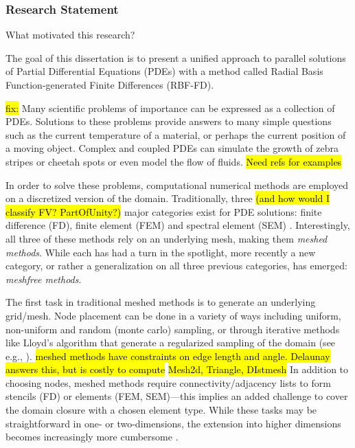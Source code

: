 \subsubsection{Research Statement} 
What motivated this research?
\label{sec:intro}

The goal of this dissertation is to present a unified approach
to parallel solutions of Partial Differential Equations (PDEs)
with a method called Radial Basis Function-generated Finite
Differences (RBF-FD).

\hl{fix:}
Many scientific problems of importance can be expressed as a
collection of PDEs. Solutions to these problems provide answers to many simple
questions such as the current temperature of a material, or perhaps the
current position of a moving object. Complex and coupled PDEs can simulate the growth of zebra stripes or cheetah spots \cite{FuselierWright2012} or even model the flow of fluids. \hl{Need refs for examples}


In order to solve these problems, computational numerical
methods are employed on a discretized version of the domain.
Traditionally, three \hl{(and how would I classify FV? PartOfUnity?)} major categories exist for PDE solutions:
finite difference (FD), finite element (FEM) and spectral
element (SEM) \cite{Fasshauer2007}. Interestingly, all three of
these methods rely on an underlying mesh, making them
\emph{meshed methods}. While each has had a turn in the
spotlight, more recently a new category, or rather a
generalization on all three previous categories, has emerged:
\emph{meshfree methods}.

The first task in traditional meshed methods is to generate an
underlying grid/mesh. Node placement can be done in a variety of
ways including uniform, non-uniform and random (monte carlo)
sampling, or through iterative methods like Lloyd's algorithm
that generate a regularized sampling of the domain (see e.g.,
\cite{Du1999}). \hl{meshed methods have constraints on edge length and angle. Delaunay answers this, but is costly to compute}
\hl{Mesh2d, Triangle, DIstmesh} In addition to choosing nodes, meshed methods
require connectivity/adjacency lists to form stencils (FD) or
elements (FEM, SEM)---this implies an added challenge to cover
the domain closure with a chosen element type. While these tasks
may be straightforward in one- or two-dimensions, the extension
into higher dimensions becomes increasingly more cumbersome
\cite{Li2007}. 

